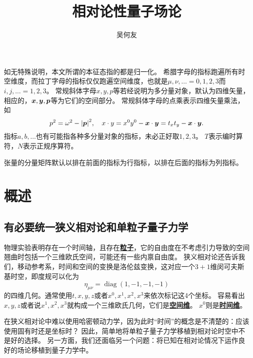 \documentclass[hyperref, UTF8, a4paper]{ctexart}
\title{相对论性量子场论}
\author{吴何友}
\DeclareMathOperator{\diag}{diag}
\newcommand{\concept}[1]{\underline{\textbf{#1}}}
\begin{document}
\maketitle

\vspace{2em}

如无特殊说明，本文所谓的本征态指的都是归一化。
希腊字母的指标跑遍所有时空维度，而拉丁字母的指标仅仅跑遍空间维度，也就是$\mu, \nu, \ldots = 0, 1, 2, 3$而$i, j, \ldots = 1, 2, 3$。
常规斜体字母$x, y, p$等若经说明为多分量对象，默认为四维矢量，相应的，$\vb*{x}, \vb*{y}, \vb*{p}$等为它们的空间部分。
常规斜体字母的点乘表示四维矢量乘法，如
\[
    p^2 = \omega^2 - \abs{\vb*{p}}^2, \quad x \cdot y = x^0 y^0 - \vb*{x} \cdot \vb*{y} = t_x t_y - \vb*{x} \cdot \vb*{y}.
\]
指标$a,b,\ldots$也有可能指各种多分量对象的指标，未必正好取$1, 2, 3$。
$T$表示编时算符，$N$表示正规序算符。

张量的分量矩阵默认以排在前面的指标为行指标，以排在后面的指标为列指标。


\section{概述}

\subsection{有必要统一狭义相对论和单粒子量子力学}

物理实验表明存在一个时间轴，且存在\concept{粒子}，它的自由度在不考虑引力导致的空间翘曲时包括一个三维欧氏空间，可能还有一些内禀自由度。
狭义相对论还告诉我们，移动参考系，时间和空间的变换是洛伦兹变换，这对应一个$3+1$维闵可夫斯基时空，即度规可以化为
\begin{equation}
    \eta_{\mu\nu} = \diag (1, -1, -1, -1)
\end{equation}
的四维几何。通常使用$t, x, y, z$或者$x^0, x^1, x^2, x^3$来依次标记这4个坐标。
容易看出$x, y, z$或者说$x^1, x^2, x^3$就构成一个三维欧氏几何，它们是\concept{空间维}。
$x^0$则是\concept{时间维}。

在狭义相对论中难以使用哈密顿动力学，因为此时“时间”的概念是不清楚的：应该使用固有时还是坐标时？
因此，简单地将单粒子量子力学移植到相对论时空中不是好的选择。
另一方面，我们还面临另一个问题：将已知在相对论情况下运作良好的场论移植到量子力学中。
\end{document}
